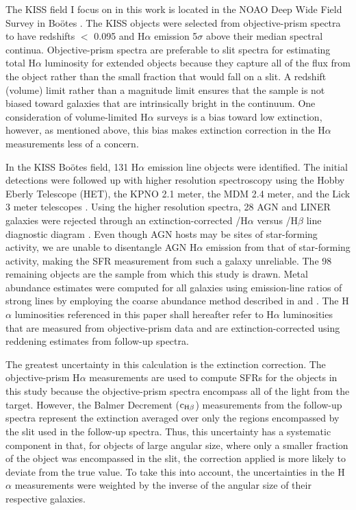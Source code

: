 The KISS field I focus on in this work is located in the NOAO Deep Wide Field Survey \citep[NDWFS;][]{Jannuzi} in Bo\"{o}tes \citep{Jangren}. The KISS objects were selected from objective-prism spectra to have redshifts $<$ 0.095 and H$\alpha$ emission 5$\sigma$ above their median spectral continua. Objective-prism spectra are preferable to slit spectra for estimating total H$\alpha$ luminosity for extended objects because they capture all of the flux from the object rather than the small fraction that would fall on a slit. A redshift (volume) limit rather than a magnitude limit ensures that the sample is not biased toward galaxies that are intrinsically bright in the continuum. One consideration of volume-limited H$\alpha$ surveys is a bias toward low extinction, however, as mentioned above, this bias makes extinction correction in the H$\alpha$ measurements less of a concern.

In the KISS Bo\"{o}tes field, 131 H$\alpha$ emission line objects were identified. The initial detections were followed up with higher resolution spectroscopy using the Hobby Eberly Telescope (HET), the KPNO 2.1 meter, the MDM 2.4 meter, and the Lick 3 meter telescopes \citep{Wegner,KISSG,Melbourne,KISSV,Salzer}. Using the higher resolution spectra, 28 AGN and LINER galaxies were rejected through an extinction-corrected /H$\alpha$ versus /H$\beta$ line diagnostic diagram \citep{Baldwin1977,Veilleux1987}. Even though AGN hosts may be sites of star-forming activity, we are unable to disentangle AGN H$\alpha$ emission from that of star-forming activity, making the SFR measurement from such a galaxy unreliable. The 98 remaining objects are the sample from which this study is drawn. Metal abundance estimates were computed for all galaxies using emission-line ratios of strong lines by employing the coarse abundance method described in \cite{MelbourneSalzer} and \cite{Salzer_Metal}. The H$\alpha$ luminosities referenced in this paper shall hereafter refer to H$\alpha$ luminosities that are measured from objective-prism data and are extinction-corrected using reddening estimates from follow-up spectra. 

The greatest uncertainty in this calculation is the extinction correction. The objective-prism H$\alpha$ measurements are used to compute SFRs for the objects in this study because the objective-prism spectra encompass all of the light from the target. However, the Balmer Decrement ($\rm{c}_{\rm{H}\beta}$) measurements from the follow-up spectra represent the extinction averaged over only the regions encompassed by the slit used in the follow-up spectra.  Thus, this uncertainty has a systematic component in that, for objects of large angular size, where only a smaller fraction of the object was encompassed in the slit, the correction applied is more likely to deviate from the true value.  To take this into account, the uncertainties in the H$\alpha$ measurements were weighted by the inverse of the angular size of their respective galaxies.

